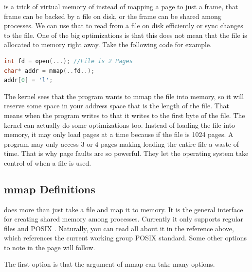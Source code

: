  is a trick of virtual memory of instead of mapping a page to just a frame, that frame can be backed by a file on disk, or the frame can be shared among processes.
We can use that to read from a file on disk efficiently or sync changes to the file.
One of the big optimizations is that this does not mean that the file is allocated to memory right away.
Take the following code for example.

\begin{lstlisting}[language=C]
int fd = open(...); //File is 2 Pages
char* addr = mmap(..fd..);
addr[0] = 'l';
\end{lstlisting}

The kernel sees that the program wants to mmap the file into memory, so it will reserve some space in your address space that is the length of the file.
That means when the program writes to  that it writes to the first byte of the file.
The kernel can actually do some optimizations too.
Instead of loading the file into memory, it may only load pages at a time because if the file is 1024 pages.
A program may only access 3 or 4 pages making loading the entire file a waste of time.
That is why page faults are so powerful.
They let the operating system take control of when a file is used.

\subsection{mmap Definitions}

 does more than just take a file and map it to memory.
It is the general interface for creating shared memory among processes.
Currently it only supports regular files and POSIX  \cite{mmap_2018}.
Naturally, you can read all about it in the reference above, which references the current working group POSIX standard.
Some other options to note in the page will follow.

The first option is that the  argument of mmap can take many options.


